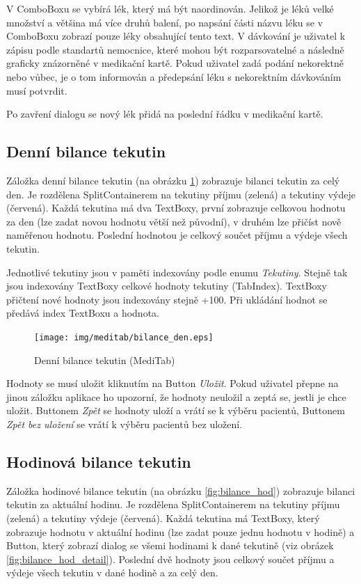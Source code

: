 V ComboBoxu se vybírá lék, který má být naordinován. Jelikož je léků velké množství a většina má více druhů balení, po napsání části názvu léku se v ComboBoxu zobrazí pouze léky obsahující tento text. V dávkování je uživatel k zápisu podle standartů nemocnice, které mohou být rozparsovatelné a následně graficky znázorněné v medikační kartě. Pokud uživatel zadá podání nekorektně nebo vůbec, je o tom informován a předepsání léku s nekorektním dávkováním musí potvrdit.

Po zavření dialogu se nový lék přidá na poslední řádku v medikační kartě.


\subsection{Denní bilance tekutin}

Záložka denní bilance tekutin (na obrázku \ref{fig:bilance_den}) zobrazuje bilanci tekutin za celý den. Je rozdělena SplitContainerem na tekutiny příjmu (zelená) a tekutiny výdeje (červená). Každá tekutina má dva TextBoxy, první zobrazuje celkovou hodnotu za den (lze zadat novou hodnotu větší než původní), v druhém lze přičíst nově naměřenou hodnotu. Poslední hodnotou je celkový součet příjmu a výdeje všech tekutin.

Jednotlivé tekutiny jsou v paměti indexovány podle enumu \emph{Tekutiny}. Stejně tak jsou indexovány TextBoxy celkové hodnoty tekutiny (TabIndex). TextBoxy přičtení nové hodnoty jsou indexovány stejně +100. Při ukládání hodnot se předává index TextBoxu a hodnota.

\begin{figure}[H]
	\centering
	\texttt{[image: img/meditab/bilance\_den.eps]}
	\caption{Denní bilance tekutin (MediTab)}
  \label{fig:bilance_den}
\end{figure}

Hodnoty se musí uložit kliknutím na Button \emph{Uložit}. Pokud uživatel přepne na jinou záložku aplikace ho upozorní, že hodnoty neuložil a zeptá se, jestli je chce uložit. Buttonem \emph{Zpět} se hodnoty uloží a vrátí se k výběru pacientů, Buttonem \emph{Zpět bez uložení} se vrátí k výběru pacientů bez uložení.

\subsection{Hodinová bilance tekutin}

Záložka hodinové bilance tekutin (na obrázku \ref{fig:bilance_hod}) zobrazuje bilanci tekutin za aktuální hodinu. Je rozdělena SplitContainerem na tekutiny příjmu (zelená) a tekutiny výdeje (červená). Každá tekutina má TextBoxy, který zobrazuje hodnotu v aktuální hodinu (lze zadat pouze jednu hodnotu v hodině) a Button, který zobrazí dialog se všemi hodinami k dané tekutině (viz obrázek \ref{fig:bilance_hod_detail}). Poslední dvě hodnoty jsou celkový součet příjmu a výdeje všech tekutin v dané hodině a za celý den.

